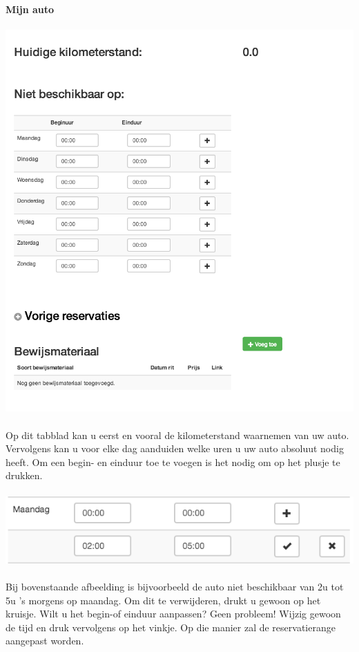 \documentclass[11pt,a4paper,oneside]{article}
\begin{document}
{\large{\textbf{Mijn auto}}} \\\\
\includegraphics[scale=0.75]{img/mijnauto} \\\\
Op dit tabblad kan u eerst en vooral de kilometerstand waarnemen van uw auto.
Vervolgens kan u voor elke dag aanduiden welke uren u uw auto absoluut nodig heeft.  Om een begin- en einduur toe te voegen is het nodig om op het plusje te drukken. \\\\
\includegraphics{reservatierangetoegevoegd} \\\\
Bij bovenstaande afbeelding is bijvoorbeeld de auto niet beschikbaar van 2u tot 5u 's morgens op maandag. Om dit te verwijderen, drukt u gewoon op het kruisje. Wilt u het begin-of einduur aanpassen? Geen probleem! Wijzig gewoon de tijd en druk vervolgens op het vinkje. Op die manier zal de reservatierange aangepast worden.
\end{document}
